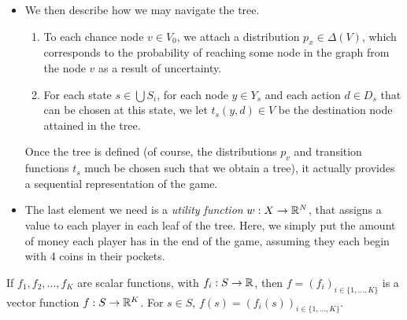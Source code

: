 \begin{example}
\begin{itemize}
\begin{enumerate}
\end{enumerate}
\item We then describe how we may navigate the tree.
\begin{enumerate}
\item To each chance node $v \in V_0$, we attach a distribution $p_x \in \Delta(V)$, which corresponds to the probability of reaching some node in the graph from the node $v$ as a result of uncertainty.
\item For each state $s \in \bigcup S_i$, for each node $y \in Y_s$ and each action $d \in D_s$ that can be chosen at this state, we let $t_s(y,d) \in V$ be the destination node attained in the tree.
\end{enumerate}
Once the tree is defined (of course, the distributions $p_v$ and transition functions $t_s$ much be chosen such that we obtain a tree), it actually provides a sequential representation of the game.
\item The last element we need is a \emph{utility function} $w : X \rightarrow \mathbb{R}^N$, that assigns a value to each player in each leaf of the tree. Here, we simply put the amount of money each player has in the end of the game, assuming they each begin with 4 coins in their pockets.
\end{itemize}
\end{example}





\begin{notation}
If $f_1, f_2, \ldots, f_K$ are scalar functions, with $f_i : S \rightarrow \mathbb{R}$,
then $f = (f_i)_{i \in \{1,\ldots, K\}}$ is a vector function $f : S \rightarrow \mathbb{R}^K$.
For $s  \in S$,
$f(s) = (f_i(s))_{i \in \{1, \ldots, K\}}.$
\end{notation}

